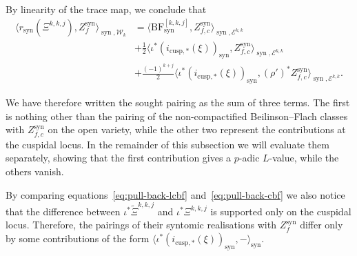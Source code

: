 \documentclass[11pt, a4paper, reqno]{amsart}
\theoremstyle{definition}
\theoremstyle{plain}
\theoremstyle{remark}
\DeclareMathOperator{\syn}{syn}
\newcommand{\Ell}{\mathcal{E}}
\newcommand{\KS}{\mathscr{W}}
\newcommand{\BF}{\mathrm{BF}}
\newcommand{\lcBF}{\widetilde{\Xi}}
\newcommand{\cBF}{\Xi}
\newcommand{\regulator}[1]{r_{#1}}
\newcommand{\rsyn}{\regulator{\syn}}
\begin{document}
By linearity of the trace map, we conclude that
\begin{equation}
    \label{eq:pairing-in-two}
    \begin{split}
        \langle \rsyn(\cBF^{k,k,j}),Z_f^{\syn} \rangle_{\syn, \KS_k} &= \langle \BF^{[k,k,j]}_{\syn}, Z_{f,c}^{\syn} \rangle_{\syn,\Ell^{k, k}} \\
        &+ \frac{1}{2}\langle \iota^*(i_{\mathrm{cusp},*}(\xi))_{\syn}, Z_{f,c}^{\syn} \rangle_{\syn,\Ell^{k, k}} \\
        &+ \frac{(-1)^{k+j}}{2}\langle \iota^*(i_{\mathrm{cusp},*}(\xi))_{\syn}, (\rho')^* Z_{f,c}^{\syn} \rangle_{\syn,\Ell^{k, k}}.
    \end{split}
\end{equation}

   We have therefore written the sought pairing as the sum of three terms. The first is nothing other than the pairing of the non-compactified Beilinson--Flach classes with $Z_{f,c}^{\syn}$ on the open variety, while the other two represent the contributions at the cuspidal locus. In the remainder of this subsection we will evaluate them separately, showing that the first contribution gives a $p$-adic $L$-value, while the others vanish.

   By comparing equations~\eqref{eq:pull-back-lcbf} and~\eqref{eq:pull-back-cbf} we also notice that the difference between $\iota^*\lcBF^{k,k,j}$ and $\iota^*\cBF^{k,k,j}$ is supported only on the cuspidal locus. Therefore, the pairings of their syntomic realisations with $Z_f^{\syn}$ differ only by some contributions of the form $\langle \iota^*(i_{\mathrm{cusp},*}(\xi ))_{\syn}, - \rangle_{\syn}$.
\end{document}

